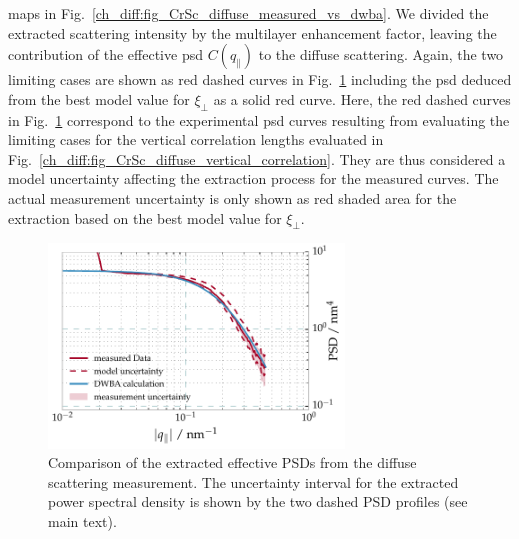 maps in Fig.~\ref{ch_diff:fig_CrSc_diffuse_measured_vs_dwba}. We divided the extracted scattering intensity by the multilayer 
enhancement factor, leaving the contribution of the effective \gls{psd} $C(q_\parallel)$ to the diffuse scattering. Again, the two limiting cases are shown as red dashed curves in 
Fig.~\ref{ch_diff:fig_CrSc_diffuse_PSD} including the \gls{psd} deduced from the best model 
value for $\xi_\perp$ as a solid red curve. Here, the red dashed curves in Fig.~\ref{ch_diff:fig_CrSc_diffuse_PSD} correspond to the experimental \gls{psd} curves resulting from evaluating the limiting cases for the vertical correlation lengths evaluated in Fig.~\ref{ch_diff:fig_CrSc_diffuse_vertical_correlation}. They are thus considered a model uncertainty affecting the extraction process for the measured curves. The actual measurement uncertainty is only shown as red shaded area for the extraction based on the best model value for $\xi_\perp$.
\begin{figure}[htbp]
  \centering
  \includegraphics[width=0.7\textwidth]{img/CrSc_diffuse_PSD}
  \caption{Comparison of the extracted effective PSDs from the diffuse 
scattering measurement. The 
uncertainty interval for the extracted power spectral density is shown by the 
two dashed PSD profiles (see main text).}
  \label{ch_diff:fig_CrSc_diffuse_PSD}
\end{figure}

